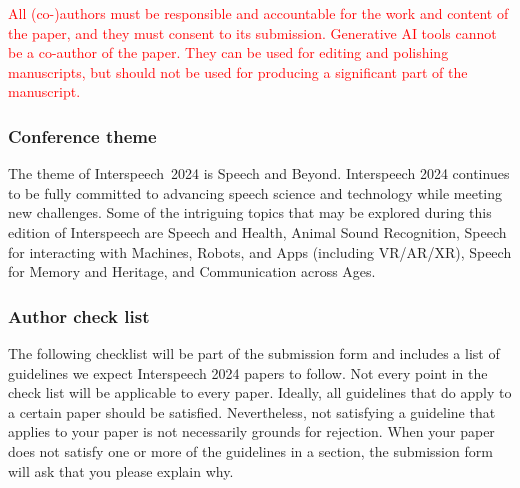 \documentclass{Interspeech2024}
\newcommand{\red}[1]{\textcolor{red}{#1}}
\begin{document}
\red{All (co-)authors must be responsible and accountable for the work and content of the paper, and they must consent to its submission. Generative AI tools cannot be a co-author of the paper. They can be used for editing and polishing manuscripts, but should not be used for producing a significant part of the manuscript.}


\subsubsection{Conference theme}

The theme of Interspeech~2024 is Speech and Beyond. Interspeech 2024 continues to be fully committed to advancing speech science and technology while meeting new challenges. Some of the intriguing topics that may be explored during this edition of Interspeech are Speech and Health, Animal Sound Recognition, Speech for interacting with Machines, Robots, and Apps (including VR/AR/XR), Speech for Memory and Heritage, and Communication across Ages.

\subsubsection{Author check list}

The following checklist will be part of the submission form and includes a list of guidelines we expect Interspeech 2024 papers to follow. Not every point in the check list will be applicable to every paper. Ideally, all guidelines that do apply to a certain paper should be satisfied. Nevertheless, not satisfying a guideline that applies to your paper is not necessarily grounds for rejection. When your paper does not satisfy one or more of the guidelines in a section, the submission form will ask that you please explain why.
\end{document}
